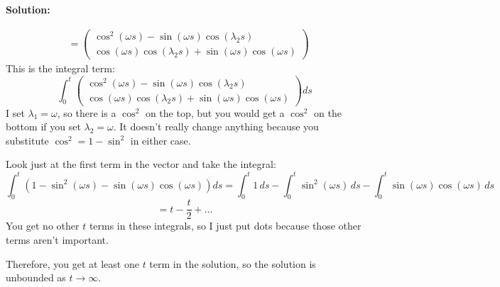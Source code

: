 \documentclass[12pt]{article}
\newenvironment{solution}{
    \textbf{Solution:}
    
}{
    
    \vspace{2em}
}
\begin{document}
\begin{solution}
\[\begin{aligned}
            &= \begin{pmatrix} \cos^2(\omega s) - \sin(\omega s)\cos(\lambda_2 s) \\ \cos(\omega s)\cos(\lambda_2 s) + \sin(\omega s)\cos(\omega s) \end{pmatrix}
        \end{aligned}
    \]
    This is the integral term:
    \[
        \int_0^t \begin{pmatrix} \cos^2(\omega s) - \sin(\omega s)\cos(\lambda_2 s) \\ \cos(\omega s)\cos(\lambda_2 s) + \sin(\omega s)\cos(\omega s) \end{pmatrix} ds
    \]
    I set \(\lambda_1 = \omega\), so there is a \(\cos^2\) on the top, but you would get a \(\cos^2\) on the bottom if you set \(\lambda_2 = \omega\). It doesn't really change anything because you substitute \(\cos^2 = 1 - \sin^2\) in either case.
    
    Look just at the first term in the vector and take the integral:
    \[
        \int_0^t \left( 1 - \sin^2(\omega s) - \sin(\omega s)\cos(\omega s) \right) ds = \int_0^t 1 \, ds - \int_0^t \sin^2(\omega s) \, ds - \int_0^t \sin(\omega s)\cos(\omega s) \, ds
    \]
    \[
        = t - \frac{t}{2} + \dots
    \]
    You get no other \(t\) terms in these integrals, so I just put dots because those other terms aren't important.

    Therefore, you get at least one \(t\) term in the solution, so the solution is unbounded as \(t \to \infty\).


\end{solution}
\end{document}

